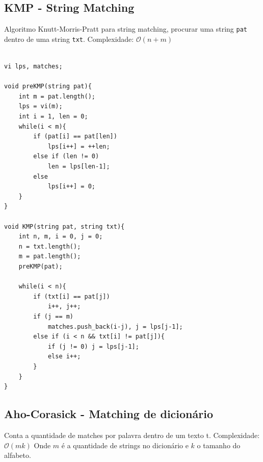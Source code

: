 \subsection{KMP - String Matching}
Algoritmo Knutt-Morris-Pratt para string matching, procurar uma string \lstinline{pat} dentro
de uma string \lstinline{txt}. Complexidade: $\mathcal{O}(n+m)$


\begin{verbatim}
    
vi lps, matches;

void preKMP(string pat){
    int m = pat.length();
    lps = vi(m);
    int i = 1, len = 0;
    while(i < m){
        if (pat[i] == pat[len])
            lps[i++] = ++len;
        else if (len != 0)
            len = lps[len-1];
        else
            lps[i++] = 0;
    }
}

void KMP(string pat, string txt){
    int n, m, i = 0, j = 0;
    n = txt.length();
    m = pat.length();
    preKMP(pat);
    
    while(i < n){
        if (txt[i] == pat[j])
            i++, j++;
        if (j == m)
            matches.push_back(i-j), j = lps[j-1];
        else if (i < n && txt[i] != pat[j]){
            if (j != 0) j = lps[j-1];
            else i++;
        }
    }
}

\end{verbatim}


\subsection{Aho-Corasick - Matching de dicionário}
Conta a quantidade de matches por palavra dentro de um texto t. Complexidade: $\mathcal{O}(mk)$ 
Onde $m$ é a quantidade de strings no dicionário e $k$ o tamanho do alfabeto.

